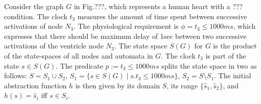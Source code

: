 \begin{exmp}
	\label{predicateBasedAbstraction}
	Consider the graph $G$ in Fig.???, which represents a human heart with a ??? condition.
	The clock $t_3$ measures the amount of time spent between successive activations of node $N_3$.
	The physiological requirement is $\phi = t_3 \leq 1000ms$, which expresses that there should be maximum delay of 1sec between two successive activations of the ventricle node $N_3$.
	The state space $S(G)$ for $G$ is the product of the state-spaces of all nodes and automata in $G$. 
	The clock $t_3$ is part of the state $s \in S(G)$.
	The predicate $p := t_3 \leq 1000ms$ splits the state space in two as follows:
	$S = S_1 \cup S_2$, $S_1 = \{s \in S(G) \;|\; s.t_3 \leq 1000ms\}$, $S_2 = S \setminus S_1$.
	The initial abstraction function $h$ is then given by its domain $S$, its range $\{\hat{s}_1, \hat{s}_2\}$, and $h(s) = \hat{s}_i$ iff $s \in S_i$.	
	
\end{exmp}